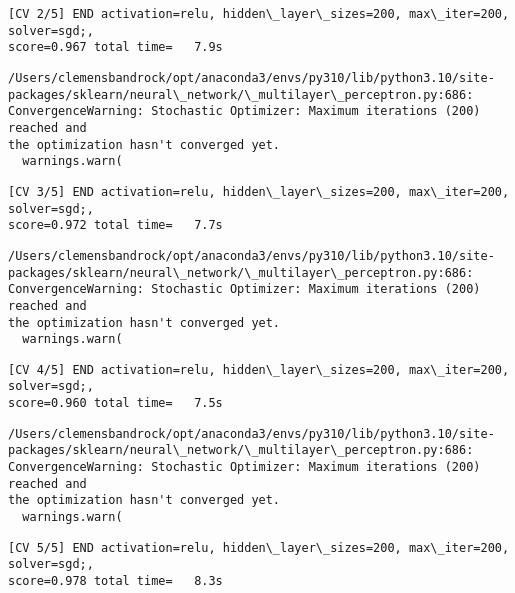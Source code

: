 \documentclass[11pt]{article}
\begin{document}
    \begin{Verbatim}[commandchars=\\\{\}]
[CV 2/5] END activation=relu, hidden\_layer\_sizes=200, max\_iter=200, solver=sgd;,
score=0.967 total time=   7.9s
    \end{Verbatim}

    \begin{Verbatim}[commandchars=\\\{\}]
/Users/clemensbandrock/opt/anaconda3/envs/py310/lib/python3.10/site-
packages/sklearn/neural\_network/\_multilayer\_perceptron.py:686:
ConvergenceWarning: Stochastic Optimizer: Maximum iterations (200) reached and
the optimization hasn't converged yet.
  warnings.warn(
    \end{Verbatim}

    \begin{Verbatim}[commandchars=\\\{\}]
[CV 3/5] END activation=relu, hidden\_layer\_sizes=200, max\_iter=200, solver=sgd;,
score=0.972 total time=   7.7s
    \end{Verbatim}

    \begin{Verbatim}[commandchars=\\\{\}]
/Users/clemensbandrock/opt/anaconda3/envs/py310/lib/python3.10/site-
packages/sklearn/neural\_network/\_multilayer\_perceptron.py:686:
ConvergenceWarning: Stochastic Optimizer: Maximum iterations (200) reached and
the optimization hasn't converged yet.
  warnings.warn(
    \end{Verbatim}

    \begin{Verbatim}[commandchars=\\\{\}]
[CV 4/5] END activation=relu, hidden\_layer\_sizes=200, max\_iter=200, solver=sgd;,
score=0.960 total time=   7.5s
    \end{Verbatim}

    \begin{Verbatim}[commandchars=\\\{\}]
/Users/clemensbandrock/opt/anaconda3/envs/py310/lib/python3.10/site-
packages/sklearn/neural\_network/\_multilayer\_perceptron.py:686:
ConvergenceWarning: Stochastic Optimizer: Maximum iterations (200) reached and
the optimization hasn't converged yet.
  warnings.warn(
    \end{Verbatim}

    \begin{Verbatim}[commandchars=\\\{\}]
[CV 5/5] END activation=relu, hidden\_layer\_sizes=200, max\_iter=200, solver=sgd;,
score=0.978 total time=   8.3s
    \end{Verbatim}
\end{document}
